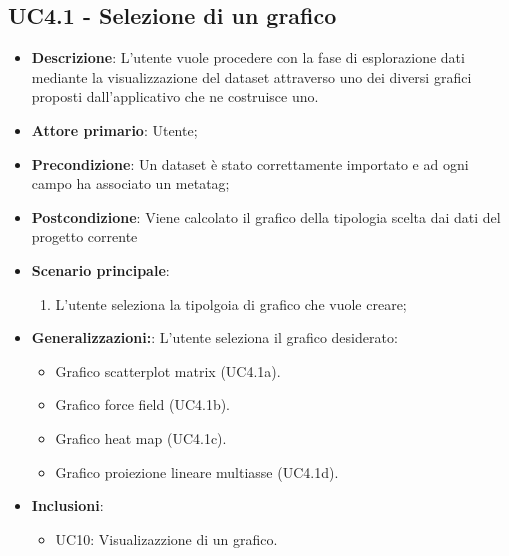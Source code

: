 \subsection{UC4.1 - Selezione di un grafico}

\begin{itemize}
    \item \textbf{Descrizione}: L’utente vuole procedere con la fase di esplorazione
                                dati mediante la visualizzazione del dataset
                                attraverso uno dei diversi grafici proposti dall’applicativo
                                che ne costruisce uno.
	
    \item \textbf{Attore primario}: Utente;
    
    \item \textbf{Precondizione}:   Un dataset è stato correttamente importato e ad ogni campo ha associato
                                    un metatag;

    \item \textbf{Postcondizione}:  Viene calcolato il grafico della tipologia scelta dai dati del progetto 
                                    corrente
	\item \textbf{Scenario principale}:
		\begin{enumerate}
			\item L'utente seleziona la tipolgoia di grafico che vuole creare;
        \end{enumerate}
    \item \textbf{Generalizzazioni:}:  L'utente seleziona il grafico desiderato:
        \begin{itemize}
            
            \item Grafico scatterplot matrix (UC4.1a).
            \item Grafico force field (UC4.1b).
            \item Grafico heat map (UC4.1c).
            \item Grafico proiezione lineare multiasse (UC4.1d).
            
        \end{itemize}
    
    \item \textbf{Inclusioni}: 
            \begin{itemize}
                \item UC10: Visualizazzione di un grafico.
            \end{itemize}
    \end{itemize}

